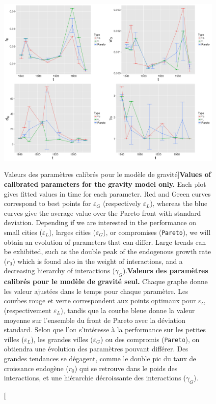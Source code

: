 \begin{figure}
\includegraphics[width=\linewidth]{Figures/Final/4-3-2-fig-interactiongibrat-gravity-params}
\caption[Values of the calibrated parameters for the gravity model][Valeurs des paramètres calibrés pour le modèle de gravité]{\textbf{Values of calibrated parameters for the gravity model only.} Each plot gives fitted values in time for each parameter. Red and Green curves correspond to best points for $\varepsilon_G$ (respectively $\varepsilon_L$), whereas the blue curves give the average value over the Pareto front with standard deviation. Depending if we are interested in the performance on small cities ($\varepsilon_L$), larges cities ($\varepsilon_G$), or compromises (\texttt{Pareto}), we will obtain an evolution of parameters that can differ. Large trends can be exhibited, such as the double peak of the endogenous growth rate ($r_0$) which is found also in the weight of interactions, and a decreasing hierarchy of interactions ($\gamma_G$).\label{fig:interactiongibrat:gravity-params}}{\textbf{Valeurs des paramètres calibrés pour le modèle de gravité seul.} Chaque graphe donne les valeur ajustées dans le temps pour chaque paramètre. Les courbes rouge et verte correspondent aux points optimaux pour $\varepsilon_G$ (respectivement $\varepsilon_L$), tandis que la courbe bleue donne la valeur moyenne sur l'ensemble du front de Pareto avec la déviation standard. Selon que l'on s'intéresse à la performance sur les petites villes ($\varepsilon_L$), les grandes villes ($\varepsilon_G$) ou des compromis (\texttt{Pareto}), on obtiendra une évolution des paramètres pouvant différer. Des grandes tendances se dégagent, comme le double pic du taux de croissance endogène ($r_0$) qui se retrouve dans le poids des interactions, et une hiérarchie décroissante des interactions ($\gamma_G$).\label{fig:interactiongibrat:gravity-params}}
\end{figure}


